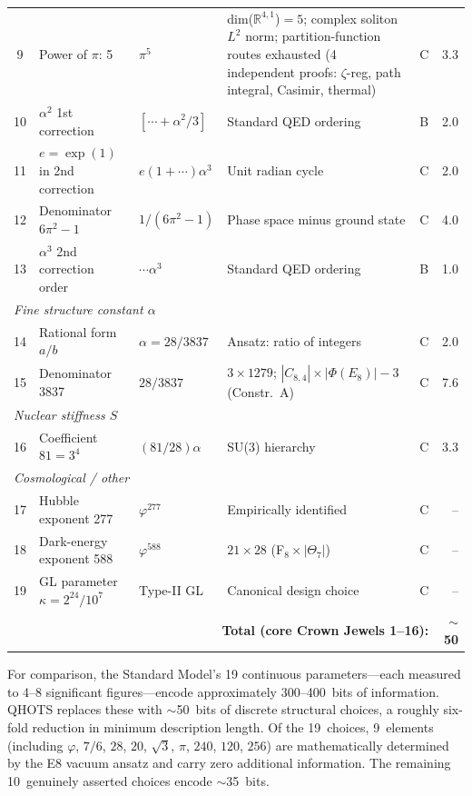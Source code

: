 \documentclass[aps,prd,twocolumn,superscriptaddress,floatfix,nofootinbib]{revtex4-2}
\theoremstyle{definition}
\theoremstyle{remark}
\newcommand{\vp}{\varphi}
\begin{document}
\begin{table}[t]
\begin{tabular}{clllcr}
9  & Power of $\pi$: 5               & $\pi^5$                   & dim($\mathbb{R}^{4,1}$)${}=5$; complex soliton $L^2$ norm; partition-function routes exhausted (4 independent proofs: $\zeta$-reg, path integral, Casimir, thermal) & C & 3.3 \\
10 & $\alpha^2$ 1st correction       & $[\cdots+\alpha^2/3]$     & Standard QED ordering                   & B & 2.0 \\
11 & $e=\exp(1)$ in 2nd correction   & $e(1+\cdots)\alpha^3$     & Unit radian cycle                       & C & 2.0 \\
12 & Denominator $6\pi^2-1$          & $1/(6\pi^2-1)$            & Phase space minus ground state          & C & 4.0 \\
13 & $\alpha^3$ 2nd correction order & $\cdots\alpha^3$          & Standard QED ordering                   & B & 1.0 \\
\midrule
\multicolumn{6}{l}{\textit{Fine structure constant $\alpha$}} \\
14 & Rational form $a/b$             & $\alpha=28/3837$          & Ansatz: ratio of integers               & C & 2.0 \\
15 & Denominator 3837                & $28/3837$                 & $3\times1279$; $|C_{8,4}|\times|\Phi(E_8)|{-}3$ (Constr.~A) & C & 7.6 \\
\midrule
\multicolumn{6}{l}{\textit{Nuclear stiffness $S$}} \\
16 & Coefficient $81 = 3^4$          & $(81/28)\alpha$           & SU(3) hierarchy                         & C & 3.3 \\
\midrule
\multicolumn{6}{l}{\textit{Cosmological / other}} \\
17 & Hubble exponent 277             & $\vp^{277}$               & Empirically identified                  & C & -- \\
18 & Dark-energy exponent 588        & $\vp^{588}$               & $21\times28$ (F$_8\times|\Theta_7|$)    & C & -- \\
19 & GL parameter $\kappa=2^{24}/10^7$ & Type-II GL              & Canonical design choice                 & C & -- \\
\midrule
    & \multicolumn{4}{r}{\textbf{Total (core Crown Jewels 1--16):}} & \textbf{$\sim$50} \\
\bottomrule
\end{tabular}
\end{table}

For comparison, the Standard Model's 19 continuous parameters---each measured
to 4--8 significant figures---encode approximately 300--400~bits of information.
QHOTS replaces these with $\sim$50~bits of discrete structural choices, a
roughly six-fold reduction in minimum description length.  Of the 19~choices,
9~elements (including $\vp$, $7/6$, $28$, $20$, $\sqrt{3}$, $\pi$, $240$,
$120$, $256$) are mathematically determined by the E8 vacuum ansatz and carry
zero additional information.  The remaining 10~genuinely asserted choices
encode $\sim$35~bits.
\end{document}
